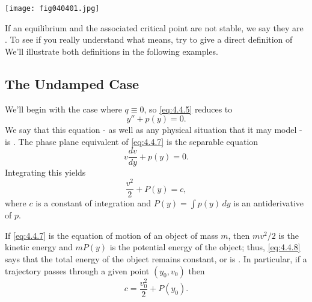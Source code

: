\documentclass{ximera}
\begin{document}
\begin{image}
 \texttt{[image: fig040401.jpg]}
\end{image}
 
If an equilibrium and the associated critical point are not stable, we
say they are . To see if you really understand what
 means, try to give a direct definition of 
We'll illustrate both definitions in
the following examples.
 
 
\subsection*{The Undamped Case}
 
We'll begin with the case where $q\equiv0$, so  \eqref{eq:4.4.5}
reduces to
 \begin{equation} \label{eq:4.4.7}
y''+p(y)=0.
\end{equation}
We say that this equation - as well as any physical situation
that it may model - is .
The phase plane equivalent of \eqref{eq:4.4.7} is  the
separable equation
$$
v\frac{dv}{dy}+p(y)=0.
$$
 Integrating this  yields
\begin{equation} \label{eq:4.4.8}
\frac{v^2}{2}+P(y)=c,
\end{equation}
where $c$ is a constant of integration and $P(y)=\int p(y)\,dy$ is an
antiderivative of $p$.
 
If \eqref{eq:4.4.7} is the equation of motion of an object of
mass $m$, then
 $mv^2/2$ is the kinetic energy and $mP(y)$ is the
potential energy of the object;   thus, \eqref{eq:4.4.8} says that the
total
energy of the object remains constant, or is . In
particular, if a trajectory passes through a given point $(y_0,v_0)$
then
$$
c=\frac{v_0^2}{2}+P(y_0).
$$
 
 
 
\end{document}
